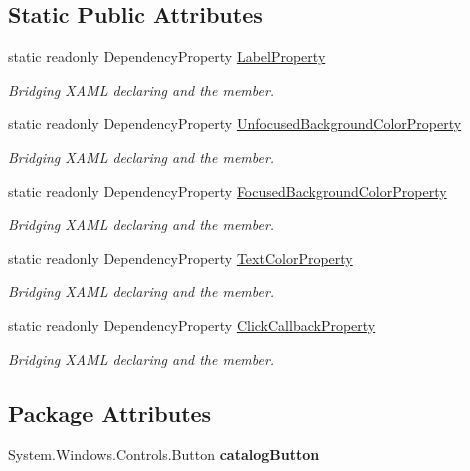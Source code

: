\subsection*{Static Public Attributes}
\begin{DoxyCompactItemize}
\item 
static readonly Dependency\+Property \mbox{\hyperlink{class_wpf_handler_1_1_u_i_1_1_controls_1_1_catalog_button_ab4d5e54d4e9edb3c3c34849f3ce9dce4}{Label\+Property}}
\begin{DoxyCompactList}\small\item\em Bridging X\+A\+ML declaring and the member. \end{DoxyCompactList}\item 
static readonly Dependency\+Property \mbox{\hyperlink{class_wpf_handler_1_1_u_i_1_1_controls_1_1_catalog_button_a607704571d71a9ca79f824962e860f3d}{Unfocused\+Background\+Color\+Property}}
\begin{DoxyCompactList}\small\item\em Bridging X\+A\+ML declaring and the member. \end{DoxyCompactList}\item 
static readonly Dependency\+Property \mbox{\hyperlink{class_wpf_handler_1_1_u_i_1_1_controls_1_1_catalog_button_afce5107ac54bea54129ff8386d9d35e8}{Focused\+Background\+Color\+Property}}
\begin{DoxyCompactList}\small\item\em Bridging X\+A\+ML declaring and the member. \end{DoxyCompactList}\item 
static readonly Dependency\+Property \mbox{\hyperlink{class_wpf_handler_1_1_u_i_1_1_controls_1_1_catalog_button_aa6d95a94eb81ade4a15936e88d9344d7}{Text\+Color\+Property}}
\begin{DoxyCompactList}\small\item\em Bridging X\+A\+ML declaring and the member. \end{DoxyCompactList}\item 
static readonly Dependency\+Property \mbox{\hyperlink{class_wpf_handler_1_1_u_i_1_1_controls_1_1_catalog_button_ab35a69a899697dca0a651d21ce61ebea}{Click\+Callback\+Property}}
\begin{DoxyCompactList}\small\item\em Bridging X\+A\+ML declaring and the member. \end{DoxyCompactList}\end{DoxyCompactItemize}
\subsection*{Package Attributes}
\begin{DoxyCompactItemize}
\item 
\mbox{\label{class_wpf_handler_1_1_u_i_1_1_controls_1_1_catalog_button_a904217841fac9694a0496fca2e43419c}} 
System.\+Windows.\+Controls.\+Button {\bfseries catalog\+Button}
\end{DoxyCompactItemize}
